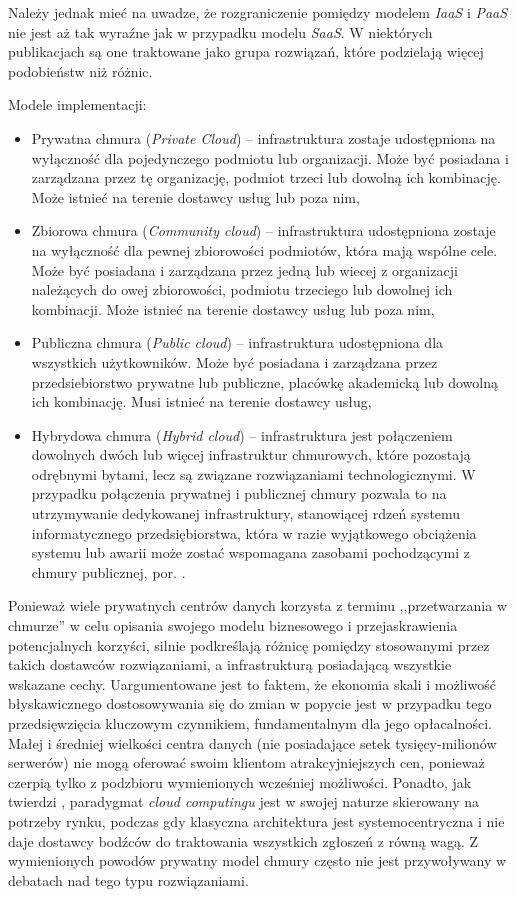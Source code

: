 \documentclass[12pt,a4paper,twoside]{article}
\begin{document}
Należy jednak mieć na uwadze, że rozgraniczenie pomiędzy modelem \textit{IaaS} i \textit{PaaS} nie jest aż tak wyraźne jak w przypadku modelu \textit{SaaS}. W niektórych publikacjach \citep{armburst2010} są one traktowane jako grupa rozwiązań, które podzielają więcej podobieństw niż różnic.

\noindent
Modele implementacji:
\begin{itemize}
\item Prywatna chmura (\textit{Private Cloud}) -- infrastruktura zostaje udostępniona na wyłączność dla pojedynczego podmiotu lub organizacji. Może być posiadana i zarządzana przez tę organizację, podmiot trzeci lub dowolną ich kombinację. Może istnieć na terenie dostawcy usług lub poza nim,
\item Zbiorowa chmura (\textit{Community cloud}) -- infrastruktura udostępniona zostaje na wyłączność dla pewnej zbiorowości podmiotów, która mają wspólne cele. Może być posiadana i zarządzana przez jedną lub wiecej z organizacji należących do owej zbiorowości, podmiotu trzeciego lub dowolnej ich kombinacji. Może istnieć na terenie dostawcy usług lub poza nim,
\item Publiczna chmura (\textit{Public cloud}) -- infrastruktura udostępniona dla wszystkich użytkowników. Może być posiadana i zarządzana przez przedsiebiorstwo prywatne lub publiczne, placówkę akademicką lub dowolną ich kombinację. Musi istnieć na terenie dostawcy usług,
\item Hybrydowa chmura (\textit{Hybrid cloud}) -- infrastruktura jest połączeniem dowolnych dwóch lub więcej infrastruktur chmurowych, które pozostają odrębnymi bytami, lecz są związane rozwiązaniami technologicznymi. W przypadku połączenia prywatnej i publicznej chmury pozwala to na utrzymywanie dedykowanej infrastruktury, stanowiącej rdzeń systemu informatycznego przedsiębiorstwa, która w razie wyjątkowego obciążenia systemu lub awarii może zostać wspomagana zasobami pochodzącymi z chmury publicznej, por. \citet{antonopoulos2010}.
\end{itemize}

Ponieważ wiele prywatnych centrów danych korzysta z terminu ,,przetwarzania w chmurze'' w celu opisania swojego modelu biznesowego i przejaskrawienia potencjalnych korzyści, \citet{armburst2010} silnie podkreślają różnicę pomiędzy stosowanymi przez takich dostawców rozwiązaniami, a infrastrukturą posiadającą wszystkie wskazane cechy. Uargumentowane jest to faktem, że ekonomia skali i możliwość błyskawicznego dostosowywania się do zmian w popycie jest w przypadku tego przedsięwzięcia kluczowym czynnikiem, fundamentalnym dla jego opłacalności. Małej i średniej wielkości centra danych (nie posiadające setek tysięcy-milionów serwerów) nie mogą oferować swoim klientom atrakcyjniejszych cen, ponieważ czerpią tylko z podzbioru wymienionych wcześniej możliwości. Ponadto, jak twierdzi , paradygmat \textit{cloud computingu} jest w swojej naturze skierowany na potrzeby rynku, podczas gdy klasyczna architektura jest systemocentryczna i nie daje dostawcy bodźców do traktowania wszystkich zgłoszeń z równą wagą. Z wymienionych powodów prywatny model chmury często nie jest przywoływany w debatach nad tego typu rozwiązaniami.
\end{document}
